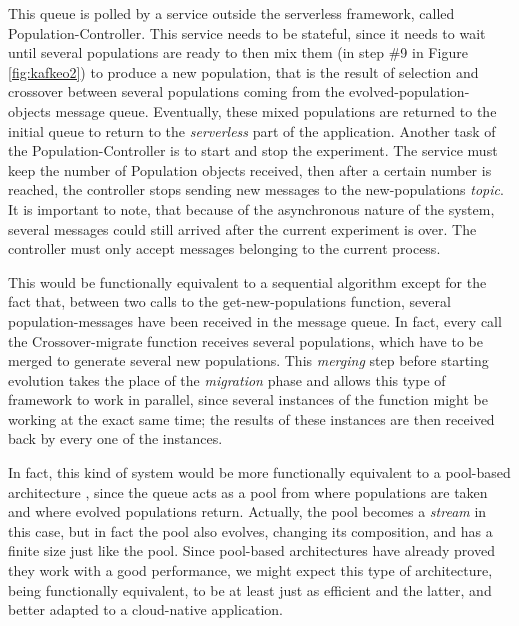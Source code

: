 \documentclass[sigconf]{acmart}
\begin{document}
This queue is polled by a service outside the serverless framework, called
{\sf Population-Controller}. This service needs to be stateful, since
it needs to wait until several populations are ready to then mix them (in
step \#9 in Figure \ref{fig:kafkeo2}) to produce a new population, that is the result of selection
and crossover between several populations coming from the {\sf
  evolved-population-objects} message queue. Eventually, these mixed
populations are returned to the initial queue to return to the {\em
  serverless} part of the application. Another task of the 
  {\sf Population-Controller} is to start and stop the experiment. The service must
  keep the number of Population objects received, then after
  a certain number is reached, the controller stops sending new messages to the
  {\sf new-populations} {\em topic}. It is important to note, that because of
  the asynchronous nature of the system, several messages could still
  arrived after the current experiment is over. The controller must only
  accept messages belonging to the current process.


This would be functionally equivalent to a sequential algorithm except
for the fact that, between two calls to the {\sf get-new-populations}
function, several
population-messages have been received in the message queue. In fact,
every call the {\sf Crossover-migrate} function receives several populations, which
have to be merged to generate several new populations. This {\em merging} step
before starting evolution takes the place of the {\em migration} phase
and allows this type of framework to work in parallel, since several
instances of the function might be working at the exact same time; the
results of these instances are then received back by every one of the
instances.

In fact, this kind of system would be more functionally equivalent to
a pool-based architecture \cite{bollini1999distributed}, since the
queue acts as a pool from where populations are taken and where
evolved populations return. Actually, the pool becomes a {\em stream}
in this case, but in fact the pool also evolves, changing its
composition, and has a finite size just like the pool. Since
pool-based architectures have already proved they work with a good
performance, we might expect this type of architecture, being
functionally equivalent, to be at least just as efficient and the
latter, and better adapted to a cloud-native application.
\end{document}
